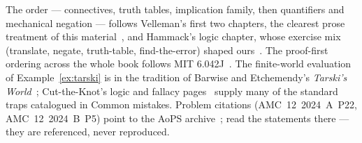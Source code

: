 \chapternotes
The order --- connectives, truth tables, implication family, then quantifiers and
mechanical negation --- follows Velleman's first two chapters, the clearest
prose treatment of this material~\cite{velleman}, and Hammack's logic chapter, whose
exercise mix (translate, negate, truth-table, find-the-error) shaped ours~\cite{hammack}.
The proof-first ordering across the whole book follows MIT 6.042J~\cite{mcs}.
The finite-world evaluation of Example~\ref{ex:tarski} is in the tradition of
Barwise and Etchemendy's \emph{Tarski's World}~\cite{barwise}; Cut-the-Knot's logic
and fallacy pages~\cite{cuttheknot} supply many of the standard traps catalogued in
Common mistakes. Problem citations (AMC~12~2024~A~P22, AMC~12~2024~B~P5) point to
the AoPS archive~\cite{aops-amc}; read the statements there --- they are referenced,
never reproduced.
